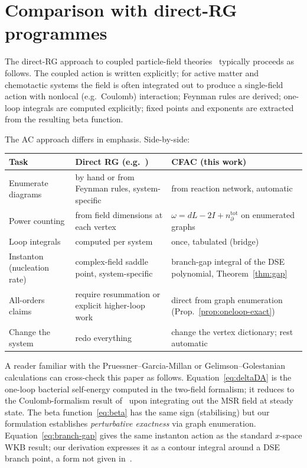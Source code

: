 \documentclass[11pt,a4paper]{article}
\theoremstyle{plain}
\begin{document}
\section{Comparison with direct-RG programmes}
\label{sec:comparison}

The direct-RG approach to coupled particle-field
theories~\cite{PruessnerGarciaMillan2025,Bothe2023,%
GelimsonGolestanian2015} typically proceeds as follows.  The
coupled action is written explicitly; for active matter and
chemotactic systems the field is often integrated out to produce
a single-field action with nonlocal (e.g.\ Coulomb)
interaction; Feynman rules are derived; one-loop integrals are
computed explicitly; fixed points and exponents are extracted from
the resulting beta function.

The AC approach differs in emphasis.  Side-by-side:

\begin{center}\small
\begin{tabular}{@{}p{}p{}p{}@{}}
\toprule
\textbf{Task} & \textbf{Direct RG (e.g.\ \cite{PruessnerGarciaMillan2025,GelimsonGolestanian2015})} & \textbf{CFAC (this work)} \\
\midrule
Enumerate diagrams & by hand or from Feynman rules, system-specific & from reaction network, automatic \\
\addlinespace
Power counting & from field dimensions at each vertex & $\omega = dL - 2I + n_\partial^{\mathrm{tot}}$ on enumerated graphs \\
\addlinespace
Loop integrals & computed per system & once, tabulated (bridge) \\
\addlinespace
Instanton (nucleation rate) & complex-field saddle point, system-specific & branch-gap integral of the DSE polynomial, Theorem~\ref{thm:gap} \\
\addlinespace
All-orders claims & require resummation or explicit higher-loop work & direct from graph enumeration (Prop.~\ref{prop:oneloop-exact}) \\
\addlinespace
Change the system & redo everything & change the vertex dictionary; rest automatic \\
\bottomrule\end{tabular}
\end{center}

A reader familiar with the Pruessner--Garcia-Millan or
Gelimson--Golestanian calculations can cross-check this paper as
follows.  Equation~\eqref{eq:deltaDA} is the one-loop bacterial
self-energy computed in the two-field formalism; it reduces to
the Coulomb-formalism result of~\cite{GelimsonGolestanian2015}
upon integrating out the MSR field at steady state.  The beta
function~\eqref{eq:beta} has the same sign (stabilising) but our
formulation establishes \emph{perturbative exactness} via
graph enumeration.  Equation~\eqref{eq:branch-gap} gives the
same instanton action as the standard $x$-space WKB result; our
derivation expresses it as a contour integral around a DSE branch
point, a form not given in~\cite{PruessnerGarciaMillan2025}.
\end{document}
